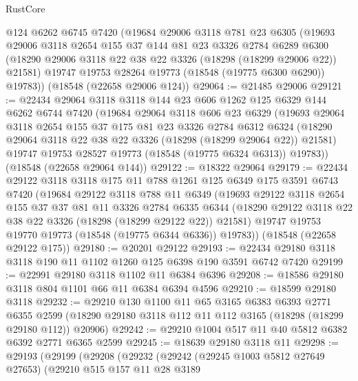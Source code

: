 \begin{lexlean}{RustCore}
\begin{coremodule}
    @124
    @6262
    @6745
    @7420
    (@19684
      @29006
      @3118
      @781
      @23
      @6305
      (@19693
        @29006
        @3118
        @2654
        @155
        @37
        @144
        @81
        @23
        @3326
        @2784
        @6289
        @6300
        (@18290 @29006 @3118 @22 @38 @22 @3326 (@18298 (@18299 @29006 @22)) @21581)
        @19747
        @19753
        @28264
        @19773
        (@18548 (@19775 @6300 @6290))
        @19783))
    (@18548 (@22658 @29006 @124))
@29064 := @21485 @29006
@29121 := @22434
    @29064
    @3118
    @3118
    @144
    @23
    @606
    @1262
    @125
    @6329
    @144
    @6262
    @6744
    @7420
    (@19684
      @29064
      @3118
      @606
      @23
      @6329
      (@19693
        @29064
        @3118
        @2654
        @155
        @37
        @175
        @81
        @23
        @3326
        @2784
        @6312
        @6324
        (@18290 @29064 @3118 @22 @38 @22 @3326 (@18298 (@18299 @29064 @22)) @21581)
        @19747
        @19753
        @28527
        @19773
        (@18548 (@19775 @6324 @6313))
        @19783))
    (@18548 (@22658 @29064 @144))
@29122 := @18322 @29064
@29179 := @22434
    @29122
    @3118
    @3118
    @175
    @11
    @788
    @1261
    @125
    @6349
    @175
    @3591
    @6743
    @7420
    (@19684
      @29122
      @3118
      @788
      @11
      @6349
      (@19693
        @29122
        @3118
        @2654
        @155
        @37
        @37
        @81
        @11
        @3326
        @2784
        @6335
        @6344
        (@18290 @29122 @3118 @22 @38 @22 @3326 (@18298 (@18299 @29122 @22)) @21581)
        @19747
        @19753
        @19770
        @19773
        (@18548 (@19775 @6344 @6336))
        @19783))
    (@18548 (@22658 @29122 @175))
@29180 := @20201 @29122
@29193 := @22434 @29180 @3118 @3118 @190 @11 @1102 @1260 @125 @6398 @190 @3591 @6742 @7420
@29199 := @22991 @29180 @3118 @1102 @11 @6384 @6396
@29208 := @18586 @29180 @3118 @804 @1101 @66 @11 @6384 @6394 @4596
@29210 := @18599 @29180 @3118
@29232 := @29210
    @130
    @1100
    @11
    @65
    @3165
    @6383
    @6393
    @2771
    @6355
    @2599
    (@18290 @29180 @3118 @112 @11 @112 @3165 (@18298 (@18299 @29180 @112)) @20906)
@29242 := @29210 @1004 @517 @11 @40 @5812 @6382 @6392 @2771 @6365 @2599
@29245 := @18639 @29180 @3118 @11
@29298 := @29193
    (@29199
      (@29208
        (@29232
          (@29242
            (@29245 @1003 @5812 @27649 @27653)
            (@29210
              @515
              @157
              @11
              @28
              @3189

\end{coremodule}
\end{lexlean}
